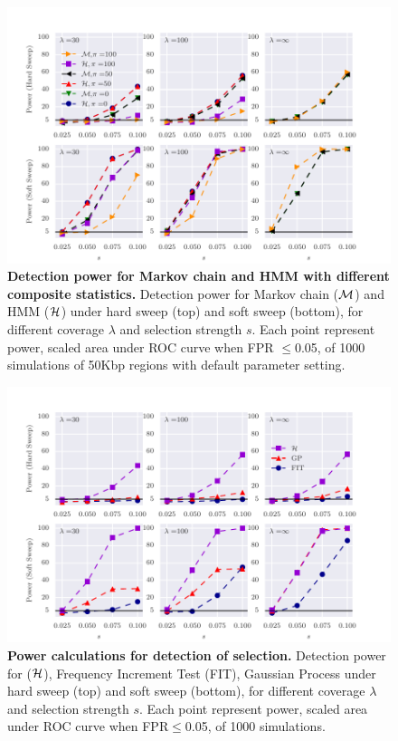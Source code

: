 \documentclass[11pt]{article}
\def\comale{\text{{\sc Comale}}}
\begin{document}
\begin{figure}[H]
	\centering
	\includegraphics[width=\textwidth]{figures/powerCLR.pdf}
	\caption{{\bf Detection power for Markov chain and HMM with
            different composite statistics.}  Detection power for
          Markov chain (${\cal M}$) and HMM (${\cal H}$) under hard sweep (top)
          and soft sweep (bottom), for different coverage $\lambda$
          and selection strength $s$.  Each point represent power,
          scaled area under ROC curve when FPR $\le$0.05, of 1000
          simulations of 50Kbp regions with default parameter setting.
        } \label{fig:powerCLR}
\end{figure}

\begin{figure}[H]
	\centering
	\includegraphics[width=\textwidth]{figures/power.pdf}
	\caption{ {\bf Power calculations for detection of selection.}
          Detection power for \comale (${\cal H}$), Frequency Increment
          Test (FIT), Gaussian Process under hard sweep (top) and soft
          sweep (bottom), for different coverage $\lambda$ and
          selection strength $s$.  Each point represent power, scaled
          area under ROC curve when FPR$\le$0.05, of 1000
          simulations.} \label{fig:power}
\end{figure}
\end{document}
